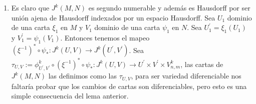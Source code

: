 \documentclass{report}
\theoremstyle{definition}
\begin{document}
\begin{enumerate}
\item Es claro que $J^k (M, N)$ es segundo numerable y adem\'as es Hausdorff por ser uni\'on ajena de Hausdorff indexados por un espacio Hausdorff. Sea $U_1$ dominio de una carta $\xi_1$ en $M$ y $V_1$ dominio de una carta $\psi_1$ en $N$. Sea $U_1^\prime = \xi_1 (U_1)$ y $V_1^\prime = \psi_1 (V_1)$. Entonces tenemos el mapeo $(\xi^{-1})^\ast \circ \psi_\ast: J^k (U, V) \to J^k( U^\prime , V^\prime)$. Sea $\tau_{U,V} := \phi_{U^\prime , V^\prime}^k \circ ( \xi^{-1})^\ast \circ \psi_\ast: J^k (U, V) \to U^\prime  \times V^\prime \times V_{n , m}^k$, las cartas de $J^k (M, N)$ las definimos como las $\tau_{U,V}$, para ser variedad diferenciable nos faltar\'ia probar que los cambios de cartas son diferenciables, pero esto es una simple consecuencia del lema anterior.


\end{enumerate}
\end{document}
